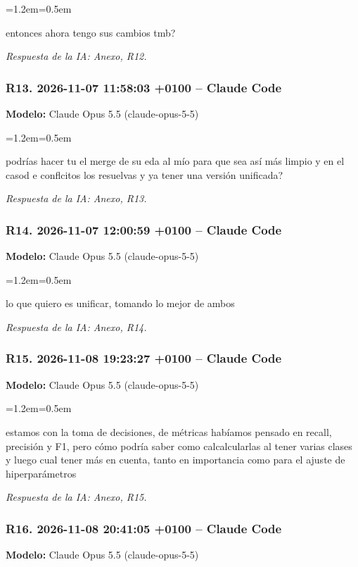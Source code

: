 \documentclass[11pt,a4paper]{article}
\newenvironment{prompt}
  {\par\smallskip\begin{list}{}{\leftmargin=1.2em\rightmargin=0.5em}\item\relax\small\color{black!80}}
  {\end{list}\smallskip}
\begin{document}
\begin{prompt}
entonces ahora tengo sus cambios tmb?
\end{prompt}

\textit{Respuesta de la IA: Anexo, R12.}

\subsubsection*{R13. 2026-11-07 11:58:03 +0100 -- Claude Code}
\textbf{Modelo:} Claude Opus 5.5 (claude-opus-5-5)

\begin{prompt}
podrías hacer tu el merge de su eda al mío para que sea así más limpio y en el casod e conflcitos los resuelvas y ya tener una versión unificada?
\end{prompt}

\textit{Respuesta de la IA: Anexo, R13.}

\subsubsection*{R14. 2026-11-07 12:00:59 +0100 -- Claude Code}
\textbf{Modelo:} Claude Opus 5.5 (claude-opus-5-5)

\begin{prompt}
lo que quiero es unificar, tomando lo mejor de ambos
\end{prompt}

\textit{Respuesta de la IA: Anexo, R14.}

\subsubsection*{R15. 2026-11-08 19:23:27 +0100 -- Claude Code}
\textbf{Modelo:} Claude Opus 5.5 (claude-opus-5-5)

\begin{prompt}
estamos con la toma de decisiones, de métricas habíamos pensado en recall, precisión y F1, pero cómo podría saber como calcalcularlas al tener varias clases y luego cual tener más en cuenta, tanto en importancia como para el ajuste de hiperparámetros
\end{prompt}

\textit{Respuesta de la IA: Anexo, R15.}

\subsubsection*{R16. 2026-11-08 20:41:05 +0100 -- Claude Code}
\textbf{Modelo:} Claude Opus 5.5 (claude-opus-5-5)
\end{document}
